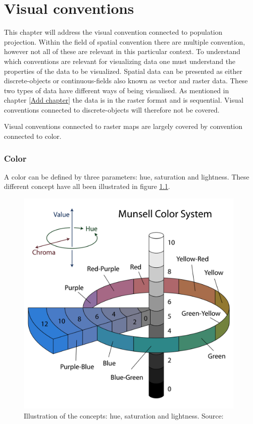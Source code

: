 \chapter{Visual conventions}

This chapter will address the visual convention connected to population projection. 
Within the field of spatial convention there are multiple convention, however not all of these are relevant in this particular context. To understand which conventions are relevant for visualizing data one must understand the properties of the data to be visualized. Spatial data can be presented as either discrete-objects or continuous-fields also known as vector and raster data. \citep{objectsNFields} These two types of data have different ways of being visualised. 
As mentioned in chapter \ref{Add chapter} the data is in the raster format and is sequential. Visual conventions connected to discrete-objects will therefore not be covered.

Visual conventions connected to raster maps are largely covered by convention connected to color. 
\subsection{Color}
A color can be defined by three parameters: hue, saturation and lightness. These different concept have all been illustrated in figure \ref{MunsellColorSystem}.

\begin{figure} [H]
	\centering
	\includegraphics[width=.8\textwidth]{Pictures/MunsellColorSystem}
	\caption{Illustration of the concepts: hue, saturation and lightness. Source: \citet{JacobRus}}
	\label{MunsellColorSystem}
\end{figure}

